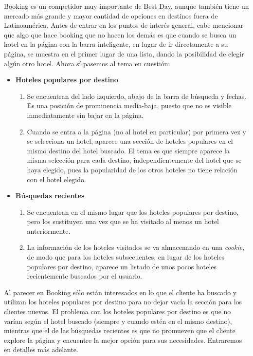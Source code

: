 \documentclass[12pt]{report}
\begin{document}
Booking es un competidor muy importante de Best Day, aunque también tiene un mercado más grande y mayor cantidad de opciones en destinos fuera de Latinoamérica. Antes de entrar en los puntos de interés general, cabe mencionar que algo que hace booking que no hacen los demás es que cuando se busca un hotel en la página con la barra inteligente, en lugar de ir directamente a su página, se muestra en el primer lugar de una lista, dando la posibilidad de elegir algún otro hotel. Ahora sí pasemos al tema en cuestión:
\begin{itemize}
	\item \textbf{Hoteles populares por destino}
	\begin{enumerate}
		\item Se encuentran del lado izquierdo, abajo de la barra de búsqueda y fechas. Es una posición de prominencia media-baja, puesto que no es visible inmediatamente sin bajar en la página.
		\item Cuando se entra a la página (no al hotel en particular) por primera vez y se selecciona un hotel, aparece una sección de hoteles populares en el mismo destino del hotel buscado. El tema es que siempre aparece la misma selección para cada destino, independientemente del hotel que se haya elegido, pues la popularidad de los otros hoteles no tiene relación con el hotel elegido.
	\end{enumerate}
	\item \textbf{Búsquedas recientes}
	\begin{enumerate}
		\item Se encuentran en el mismo lugar que los hoteles populares por destino, pero los sustituyen una vez que se ha visitado al menos un hotel anteriormente.
		\item La información de los hoteles visitados se va almacenando en una \emph{cookie}, de modo que para los hoteles subsecuentes, en lugar de los hoteles populares por destino, aparece un listado de unos pocos hoteles recientemente buscados por el usuario.
	\end{enumerate}
\end{itemize}
Al parecer en Booking sólo están interesados en lo que el cliente ha buscado y utilizan los hoteles populares por destino para no dejar vacía la sección para los clientes nuevos. El problema con los hoteles populares por destino es que no varían según el hotel buscado (siempre y cuando estén en el mismo destino), mientras que el de las búsquedas recientes es que no promueven que el cliente explore la página y encuentre la mejor opción para sus necesidades. Entraremos en detalles más adelante.
\end{document}
